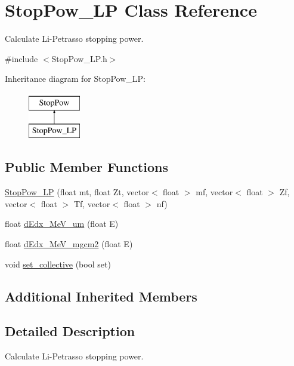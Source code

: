 \hypertarget{class_stop_pow___l_p}{\section{Stop\-Pow\-\_\-\-L\-P Class Reference}
\label{class_stop_pow___l_p}
}


Calculate Li-\/\-Petrasso stopping power.  




{\ttfamily \#include $<$Stop\-Pow\-\_\-\-L\-P.\-h$>$}

Inheritance diagram for Stop\-Pow\-\_\-\-L\-P\-:\begin{figure}[H]
\begin{center}
\leavevmode
\includegraphics[height=2.000000cm]{class_stop_pow___l_p}
\end{center}
\end{figure}
\subsection*{Public Member Functions}
\begin{DoxyCompactItemize}
\item 
\hyperlink{class_stop_pow___l_p_a342a69be12f73b3d806a60817fa2c5ef}{Stop\-Pow\-\_\-\-L\-P} (float mt, float Zt, vector$<$ float $>$ mf, vector$<$ float $>$ Zf, vector$<$ float $>$ Tf, vector$<$ float $>$ nf)
\item 
float \hyperlink{class_stop_pow___l_p_a0064b2733a7c65d35779d911c8d91cd9}{d\-Edx\-\_\-\-Me\-V\-\_\-um} (float E)
\item 
float \hyperlink{class_stop_pow___l_p_a41a4a36b3a6255a1aed980e127c77af1}{d\-Edx\-\_\-\-Me\-V\-\_\-mgcm2} (float E)
\item 
void \hyperlink{class_stop_pow___l_p_a6681c2fe11c394e0f5515c10db9ef677}{set\-\_\-collective} (bool set)
\end{DoxyCompactItemize}
\subsection*{Additional Inherited Members}


\subsection{Detailed Description}
Calculate Li-\/\-Petrasso stopping power. 

